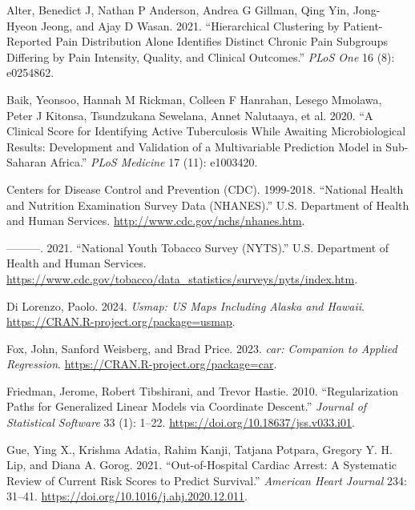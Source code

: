 \documentclass[
  letterpaper,
]{latex/krantz}
\newlength{\cslhangindent}
\newenvironment{CSLReferences}[2] %
 {\begin{list}{}{%
  \setlength{\itemindent}{0pt}
  \setlength{\leftmargin}{0pt}
  \setlength{\parsep}{0pt}
  \ifodd #1
   \setlength{\leftmargin}{\cslhangindent}
   \setlength{\itemindent}{-1\cslhangindent}
  \fi
  \setlength{\itemsep}{#2\baselineskip}}}
 {\end{list}}
\begin{document}
\label{refs}
\begin{CSLReferences}{1}{0}
Alter, Benedict J, Nathan P Anderson, Andrea G Gillman, Qing Yin,
Jong-Hyeon Jeong, and Ajay D Wasan. 2021. {``Hierarchical Clustering by
Patient-Reported Pain Distribution Alone Identifies Distinct Chronic
Pain Subgroups Differing by Pain Intensity, Quality, and Clinical
Outcomes.''} \emph{PLoS One} 16 (8): e0254862.

Baik, Yeonsoo, Hannah M Rickman, Colleen F Hanrahan, Lesego Mmolawa,
Peter J Kitonsa, Tsundzukana Sewelana, Annet Nalutaaya, et al. 2020.
{``A Clinical Score for Identifying Active Tuberculosis While Awaiting
Microbiological Results: Development and Validation of a Multivariable
Prediction Model in Sub-Saharan Africa.''} \emph{PLoS Medicine} 17 (11):
e1003420.

Centers for Disease Control and Prevention (CDC). 1999-2018.
{``{National Health and Nutrition Examination Survey Data (NHANES)}.''}
{U.S. Department of Health and Human Services}.
\url{http://www.cdc.gov/nchs/nhanes.htm}.

---------. 2021. {``{National Youth Tobacco Survey (NYTS)}.''} {U.S.
Department of Health and Human Services}.
\url{https://www.cdc.gov/tobacco/data_statistics/surveys/nyts/index.htm}.

Di Lorenzo, Paolo. 2024. \emph{Usmap: US Maps Including Alaska and
Hawaii}. \url{https://CRAN.R-project.org/package=usmap}.

Fox, John, Sanford Weisberg, and Brad Price. 2023. \emph{{car: Companion
to Applied Regression}}. \url{https://CRAN.R-project.org/package=car}.

Friedman, Jerome, Robert Tibshirani, and Trevor Hastie. 2010.
{``Regularization Paths for Generalized Linear Models via Coordinate
Descent.''} \emph{Journal of Statistical Software} 33 (1): 1--22.
\url{https://doi.org/10.18637/jss.v033.i01}.

Gue, Ying X., Krishma Adatia, Rahim Kanji, Tatjana Potpara, Gregory Y.
H. Lip, and Diana A. Gorog. 2021. {``Out-of-Hospital Cardiac Arrest: A
Systematic Review of Current Risk Scores to Predict Survival.''}
\emph{American Heart Journal} 234: 31--41.
\url{https://doi.org/10.1016/j.ahj.2020.12.011}.


\end{CSLReferences}
\end{document}

